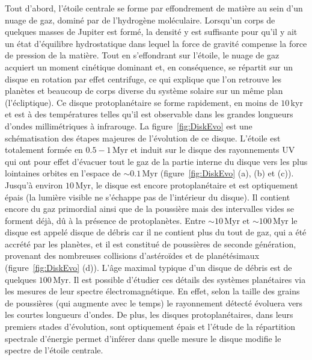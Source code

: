 Tout d'abord, l'étoile centrale se forme par effondrement de matière au sein d'un nuage de gaz, dominé par de l'hydrogène moléculaire. Lorsqu'un corps de quelques masses de Jupiter est formé, la densité y est suffisante pour qu'il y ait un état d'équilibre hydrostatique dans lequel la force de gravité compense la force de pression de la matière. Tout en s'effondrant sur l'étoile, le nuage de gaz acquiert un moment cinétique dominant et, en conséquence, se répartit sur un disque en rotation par effet centrifuge, ce qui explique que l'on retrouve les planètes et beaucoup de corps diverse du système solaire sur un même plan (l'écliptique). Ce disque protoplanétaire \citep{williams2011} se forme rapidement, en moins de $10 \,$kyr et est à des températures telles qu'il est observable dans les grandes longueurs d'ondes millimétriques à infrarouge. La figure~\ref{fig:DiskEvo} est une schématisation des étapes majeures de l'évolution de ce disque. L'étoile est totalement formée en $0.5 - 1 \,$Myr et induit sur le disque des rayonnements \ac{UV} qui ont pour effet d'évacuer tout le gaz de la partie interne du disque vers les plus lointaines orbites en l'espace de $\sim 0.1 \,$Myr (figure~\ref{fig:DiskEvo} (a), (b) et (c)). Jusqu'à environ $10 \,$Myr, le disque est encore protoplanétaire et est optiquement épais (la lumière visible ne s'échappe pas de l'intérieur du disque). Il contient encore du gaz primordial ainsi que de la poussière mais des intervalles vides se forment déjà, dû à la présence de protoplanètes. Entre $\sim 10 \,$Myr et $\sim 100 \,$Myr le disque est appelé disque de débris \citep{wyatt2008} car il ne contient plus du tout de gaz, qui a été accrété par les planètes, et il est constitué de poussières de seconde génération, provenant des nombreuses collisions d'astéroïdes et de planétésimaux (figure~\ref{fig:DiskEvo} (d)). L'âge maximal typique d'un disque de débris est de quelques $100 \,$Myr. Il est possible d'étudier ces détails des systèmes planétaires via les mesures de leur spectre électromagnétique. En effet, selon la taille des grains de poussières (qui augmente avec le temps) le rayonnement détecté évoluera vers les courtes longueurs d'ondes. De plus, les disques protoplanétaires, dans leurs premiers stades d'évolution, sont optiquement épais et l'étude de la répartition spectrale d'énergie permet d'inférer dans quelle mesure le disque modifie le spectre de l'étoile centrale.

